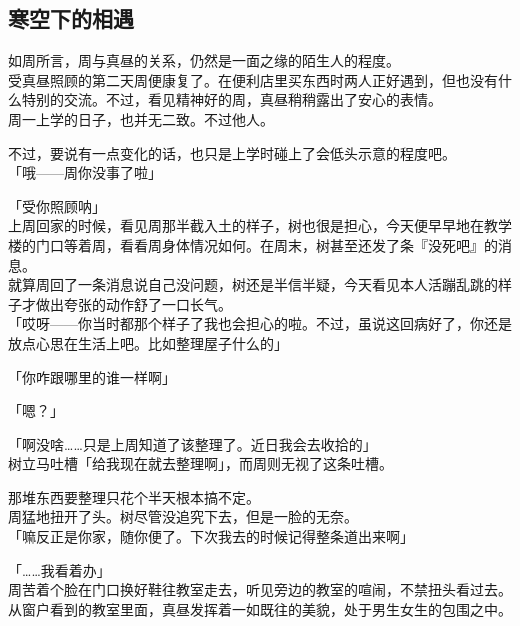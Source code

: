 \subsection{寒空下的相遇}

如周所言，周与真昼的关系，仍然是一面之缘的陌生人的程度。\\

受真昼照顾的第二天周便康复了。在便利店里买东西时两人正好遇到，但也没有什么特别的交流。不过，看见精神好的周，真昼稍稍露出了安心的表情。\\

周一上学的日子，也并无二致。不过他人。

不过，要说有一点变化的话，也只是上学时碰上了会低头示意的程度吧。\\

「哦——周你没事了啦」

「受你照顾呐」\\

上周回家的时候，看见周那半截入土的样子，树也很是担心，今天便早早地在教学楼的门口等着周，看看周身体情况如何。在周末，树甚至还发了条『没死吧』的消息。\\

就算周回了一条消息说自己没问题，树还是半信半疑，今天看见本人活蹦乱跳的样子才做出夸张的动作舒了一口长气。\\

「哎呀——你当时都那个样子了我也会担心的啦。不过，虽说这回病好了，你还是放点心思在生活上吧。比如整理屋子什么的」

「你咋跟哪里的谁一样啊」

「嗯？」

「啊没啥……只是上周知道了该整理了。近日我会去收拾的」\\

树立马吐槽「给我现在就去整理啊」，而周则无视了这条吐槽。

那堆东西要整理只花个半天根本搞不定。\\

周猛地扭开了头。树尽管没追究下去，但是一脸的无奈。\\

「嘛反正是你家，随你便了。下次我去的时候记得整条道出来啊」

「……我看着办」\\

周苦着个脸在门口换好鞋往教室走去，听见旁边的教室的喧闹，不禁扭头看过去。\\

从窗户看到的教室里面，真昼发挥着一如既往的美貌，处于男生女生的包围之中。

